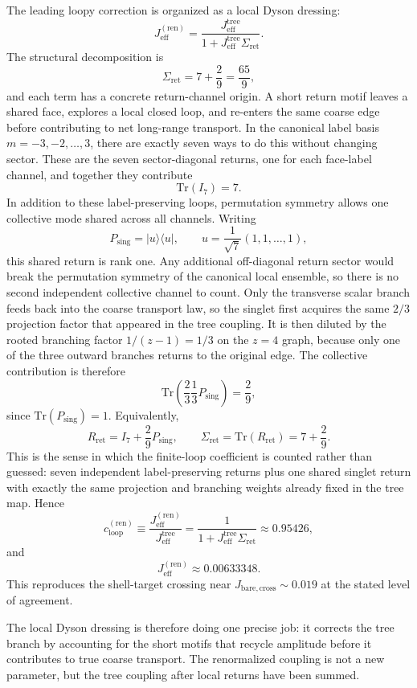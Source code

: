 \documentclass[11pt]{article}
\begin{document}
The leading loopy correction is organized as a local Dyson dressing:
\[
J_{\mathrm{eff}}^{(\mathrm{ren})}
=
\frac{J_{\mathrm{eff}}^{\mathrm{tree}}}{1+J_{\mathrm{eff}}^{\mathrm{tree}}\Sigma_{\mathrm{ret}}}.
\]
The structural decomposition is
\[
\Sigma_{\mathrm{ret}}=7+\frac{2}{9}=\frac{65}{9},
\]
and each term has a concrete return-channel origin. A short return motif leaves a shared face, explores a local closed loop, and re-enters the same coarse edge before contributing to net long-range transport. In the canonical label basis $m=-3,-2,\ldots,3$, there are exactly seven ways to do this without changing sector. These are the seven sector-diagonal returns, one for each face-label channel, and together they contribute
\[
\mathrm{Tr}(I_7)=7.
\]
In addition to these label-preserving loops, permutation symmetry allows one collective mode shared across all channels. Writing
\[
P_{\mathrm{sing}}=|u\rangle\langle u|,
\qquad
u=\frac{1}{\sqrt 7}(1,1,\ldots,1),
\]
this shared return is rank one. Any additional off-diagonal return sector would break the permutation symmetry of the canonical local ensemble, so there is no second independent collective channel to count. Only the transverse scalar branch feeds back into the coarse transport law, so the singlet first acquires the same $2/3$ projection factor that appeared in the tree coupling. It is then diluted by the rooted branching factor $1/(z-1)=1/3$ on the $z=4$ graph, because only one of the three outward branches returns to the original edge. The collective contribution is therefore
\[
\mathrm{Tr}\!\left(\frac{2}{3}\frac{1}{3}P_{\mathrm{sing}}\right)=\frac{2}{9},
\]
since $\mathrm{Tr}(P_{\mathrm{sing}})=1$. Equivalently,
\[
R_{\mathrm{ret}}=I_7+\frac{2}{9}P_{\mathrm{sing}},
\qquad
\Sigma_{\mathrm{ret}}=\mathrm{Tr}(R_{\mathrm{ret}})=7+\frac{2}{9}.
\]
This is the sense in which the finite-loop coefficient is counted rather than guessed: seven independent label-preserving returns plus one shared singlet return with exactly the same projection and branching weights already fixed in the tree map. Hence
\[
c_{\mathrm{loop}}^{(\mathrm{ren})}
\equiv
\frac{J_{\mathrm{eff}}^{(\mathrm{ren})}}{J_{\mathrm{eff}}^{\mathrm{tree}}}
=
\frac{1}{1+J_{\mathrm{eff}}^{\mathrm{tree}}\Sigma_{\mathrm{ret}}}
\approx 0.95426,
\]
and
\[
J_{\mathrm{eff}}^{(\mathrm{ren})}\approx 0.00633348.
\]
This reproduces the shell-target crossing near $J_{\mathrm{bare,cross}}\sim 0.019$ at the stated level of agreement.

The local Dyson dressing is therefore doing one precise job: it corrects the tree branch by accounting for the short motifs that recycle amplitude before it contributes to true coarse transport. The renormalized coupling is not a new parameter, but the tree coupling after local returns have been summed.
\end{document}

